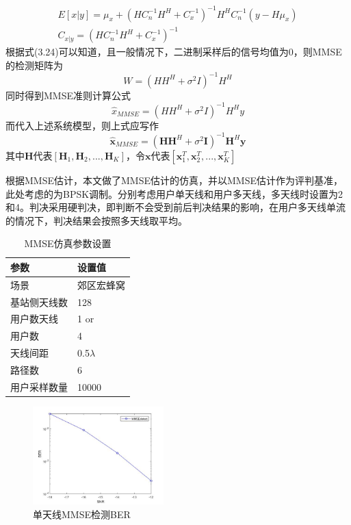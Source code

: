 \documentclass[bachelor,nocolorlinks, printoneside]{seuthesis} %
\begin{document}
\begin{Main}
\begin{gather}\label{key}
E[x|y] = \mu_{x} + (HC_n^{-1}H^H + C_x^{-1})^{-1}H^H C_n^{-1}(y-H\mu_{x}) \\ 
C_{x|y} = (H C_n^{-1} H^H + C_x^{-1})^{-1}
\end{gather}
根据式(3.24)可以知道，且一般情况下，二进制采样后的信号均值为0，则MMSE的检测矩阵为
\begin{equation}\label{key}
{W} = ({H}{H}^H + \sigma^2 {I})^{-1}{H}^H
\end{equation}
同时得到MMSE准则计算公式
\begin{equation}\label{key}
\hat{x}_{MMSE} = (HH^H + \sigma^2 I)^{-1}H^H y
\end{equation}
而代入上述系统模型，则上式应写作
\begin{equation}\label{key}
\hat{\mathbf{x}}_{MMSE} = (\mathbf{H}\mathbf{H}^H + \sigma^2 \mathbf{I})^{-1}\mathbf{H}^H \mathbf{y}
\end{equation}
其中$\mathbf{H}$代表$[\mathbf{H}_1,\mathbf{H}_2,...,\mathbf{H}_K]$，令$\mathbf{x}$代表$[\mathbf{x}_1^T,\mathbf{x}_2^T,...,\mathbf{x}_K^T]$


根据MMSE估计，本文做了MMSE估计的仿真，并以MMSE估计作为评判基准，此处考虑的为BPSK调制。分别考虑用户单天线和用户多天线，多天线时设置为2和4。判决采用硬判决，即判断不会受到前后判决结果的影响，在用户多天线单流的情况下，判决结果会按照多天线取平均。
\begin{table}[htbp]
	\centering
	\caption{\label{tab:test}MMSE仿真参数设置}
	\begin{tabular}{ll}
		\toprule
		参数 &  设置值 \\
		\bottomrule
		场景 &  郊区宏蜂窝 \\
		\bottomrule
		基站侧天线数 & 128 \\
		\bottomrule
		用户数天线	& 1 \quad or\quad2 \\
		\bottomrule
		用户数	& 4 \\
		\bottomrule
		天线间距 & 0.5$\lambda$ \\
		\bottomrule
		路径数 & 6 \\
		\bottomrule
		用户采样数量 & 10000 \\
		\bottomrule
	\end{tabular}
\end{table}

\begin{figure}[htbp!]
	\centering \includegraphics[width=0.45\textwidth]{img/3_1.jpg} \caption{单天线MMSE检测BER}
\end{figure}


\end{Main}
\end{document}
